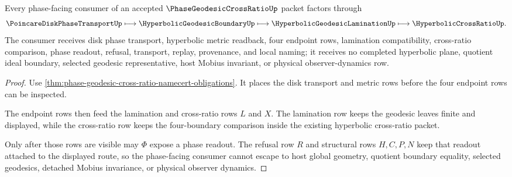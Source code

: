 \begin{theorem}
\label{thm:phase-geodesic-cross-ratio-route}
Every phase-facing consumer of an accepted $\PhaseGeodesicCrossRatioUp$ packet factors through
$$
\PoincareDiskPhaseTransportUp \longmapsto \HyperbolicGeodesicBoundaryUp \longmapsto \HyperbolicGeodesicLaminationUp \longmapsto \HyperbolicCrossRatioUp .
$$
The consumer receives disk phase transport, hyperbolic metric readback, four endpoint rows, lamination compatibility, cross-ratio comparison, phase readout, refusal, transport, replay, provenance, and local naming; it receives no completed hyperbolic plane, quotient ideal boundary, selected geodesic representative, host Mobius invariant, or physical observer-dynamics row.
\end{theorem}
\begin{proof}
Use \autoref{thm:phase-geodesic-cross-ratio-namecert-obligations}. It places the disk transport and metric rows before the four endpoint rows can be inspected.

The endpoint rows then feed the lamination and cross-ratio rows $L$ and $X$. The lamination row keeps the geodesic leaves finite and displayed, while the cross-ratio row keeps the four-boundary comparison inside the existing hyperbolic cross-ratio packet.

Only after those rows are visible may $\Phi$ expose a phase readout. The refusal row $R$ and structural rows $H,C,P,N$ keep that readout attached to the displayed route, so the phase-facing consumer cannot escape to host global geometry, quotient boundary equality, selected geodesics, detached Mobius invariance, or physical observer dynamics.
\end{proof}



